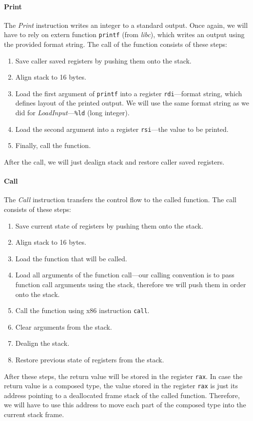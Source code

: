 \documentclass[thesis=M,english]{FITthesis}[2019/12/23]
\begin{document}
\paragraph*{Print} The \emph{Print} instruction writes an integer to a standard output. Once again, we will have to rely on extern function \texttt{printf} (from \emph{libc}), which writes an output using the provided format string. The call of the function consists of these steps:
\begin{enumerate}
    \item Save caller saved registers by pushing them onto the stack.
    \item Align stack to 16 bytes.
    \item Load the first argument of \texttt{printf} into a register \texttt{rdi}---format string, which defines layout of the printed output. We will use the same format string as we did for \emph{LoadInput}---\texttt{\%ld} (long integer).
    \item Load the second argument into a register \texttt{rsi}---the value to be printed.
    \item Finally, call the function.
\end{enumerate}
After the call, we will just dealign stack and restore caller saved registers.

\paragraph*{Call} The \emph{Call} instruction transfers the control flow to the called function. The call consists of these steps:
\begin{enumerate}
    \item Save current state of registers by pushing them onto the stack.
    \item Align stack to 16 bytes.
    \item Load the function that will be called.
    \item Load all arguments of the function call---our calling convention is to pass function call arguments using the stack, therefore we will push them in order onto the stack.
    \item Call the function using x86 instruction \texttt{call}.
    \item Clear arguments from the stack.
    \item Dealign the stack.
    \item Restore previous state of registers from the stack.
\end{enumerate}
After these steps, the return value will be stored in the register \texttt{rax}. In case the return value is a composed type, the value stored in the register \texttt{rax} is just its address pointing to a deallocated frame stack of the called function. Therefore, we will have to use this address to move each part of the composed type into the current stack frame.
\end{document}
